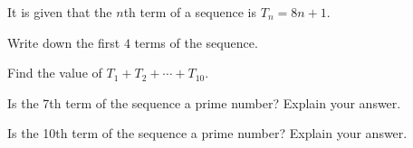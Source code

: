  It is given that the $n$th term of a sequence is $T_n = 8n + 1$.

\begin{subparts}
  \item
  \begin{subpartsii}
    \item Write down the first $4$ terms of the sequence.
    \item Find the value of $T_1 + T_2 + \cdots + T_{10}$.
  \end{subpartsii}

  \item
  \begin{subpartsii}
    \item Is the 7th term of the sequence a prime number? Explain your answer.
    \item Is the 10th term of the sequence a prime number? Explain your answer.
  \end{subpartsii}
\end{subparts}

